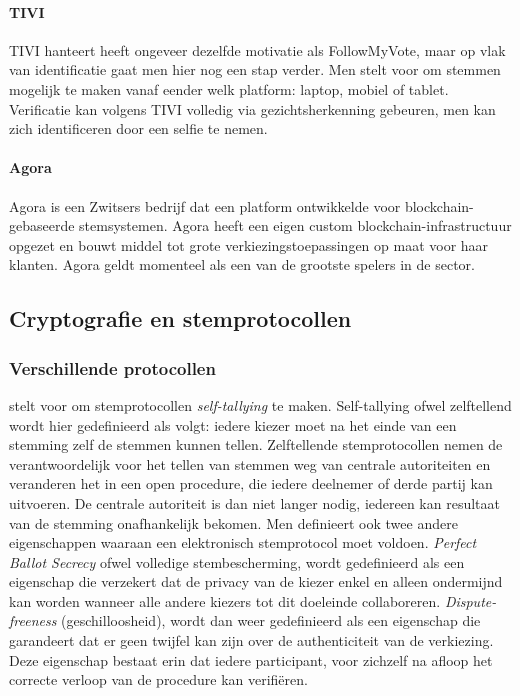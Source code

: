 				\paragraph{TIVI}
					TIVI hanteert heeft ongeveer dezelfde motivatie als FollowMyVote, maar op vlak van identificatie gaat men hier nog een stap verder. Men stelt voor om stemmen mogelijk te maken vanaf eender welk platform: laptop, mobiel of tablet. Verificatie kan volgens TIVI volledig via gezichtsherkenning gebeuren, men kan zich  identificeren door een selfie te nemen.
				\paragraph{Agora}
					Agora is een Zwitsers bedrijf dat een platform ontwikkelde voor blockchain-gebaseerde stemsystemen. Agora heeft een eigen custom blockchain-infrastructuur opgezet en bouwt middel tot grote verkiezingstoepassingen op maat voor haar klanten. Agora geldt momenteel als een van de grootste spelers in de sector.
					
	\subsection{Cryptografie en stemprotocollen}
		\subsubsection{Verschillende protocollen}
		\textcite{Kiayias2002} stelt voor om stemprotocollen \textit{self-tallying} te maken. Self-tallying ofwel zelftellend wordt hier gedefinieerd als volgt: iedere kiezer moet na het einde van een stemming zelf de stemmen kunnen tellen. Zelftellende stemprotocollen nemen de verantwoordelijk voor het tellen van stemmen weg van centrale autoriteiten en veranderen het in een open procedure, die iedere deelnemer of derde partij kan uitvoeren. De centrale autoriteit is dan niet langer nodig, iedereen kan resultaat van de stemming onafhankelijk bekomen. Men definieert ook twee andere eigenschappen waaraan een elektronisch stemprotocol moet voldoen.  \textit{Perfect Ballot Secrecy} ofwel volledige stembescherming, wordt gedefinieerd als een eigenschap die verzekert dat de privacy van de kiezer enkel en alleen ondermijnd kan worden wanneer alle andere kiezers tot dit doeleinde collaboreren. \textit{Dispute-freeness} (geschilloosheid), wordt dan weer gedefinieerd als een eigenschap die garandeert dat er geen twijfel kan zijn over de authenticiteit van de verkiezing. Deze eigenschap bestaat erin dat iedere participant,  voor zichzelf na afloop het correcte verloop van de procedure kan verifiëren.
			
